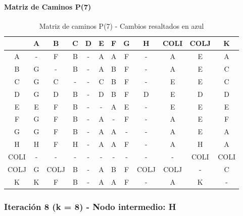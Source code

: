 \documentclass[12pt]{article}
\begin{document}
\paragraph{Matriz de Caminos P(7)}
\begin{table}[h!]
\centering
\begin{tabular}{|c|c|c|c|c|c|c|c|c|c|c|c|}
\hline
 & A & B & C & D & E & F & G & H & COLI & COLJ & K \\\hline
A & - & F & B & - & A & A & F & - & A & E & A \\\hline
B & \cellcolor{lightblue} G & - & B & - & \cellcolor{lightblue} A & B & F & - & A & E & C \\\hline
C & \cellcolor{lightblue} G & C & - & - & C & B & F & - & E & E & C \\\hline
D & \cellcolor{lightblue} G & D & B & - & D & B & F & D & E & D & D \\\hline
E & E & F & B & - & - & A & E & - & E & E & E \\\hline
F & \cellcolor{lightblue} G & F & B & - & A & - & F & - & A & E & F \\\hline
G & G & F & B & - & A & A & - & - & A & E & A \\\hline
H & H & F & H & - & A & A & F & - & A & H & A \\\hline
COLI & - & - & - & - & - & - & - & - & - & COLI & COLI \\\hline
COLJ & \cellcolor{lightblue} G & COLJ & B & - & \cellcolor{lightblue} A & B & F & COLJ & COLJ & - & C \\\hline
K & K & F & B & - & A & A & F & - & A & K & - \\\hline
\end{tabular}
\caption{Matriz de caminos P(7) - Cambios resaltados en azul}
\end{table}

\subsubsection{Iteración 8 (k = 8) - Nodo intermedio: H}
\end{document}
